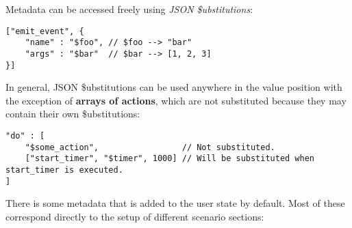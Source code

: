 \documentclass[a4paper]{article}
\begin{document}
\noindent
Metadata can be accessed freely using \emph{JSON \$ubstitutions}:


\begin{verbatim}
["emit_event", {
    "name" : "$foo", // $foo --> "bar"
    "args" : "$bar"  // $bar --> [1, 2, 3]
}]
\end{verbatim}




\noindent
In general, JSON \$ubstitutions can be used anywhere in the value position with the exception of \textbf{arrays of actions}, which are not substituted because they may contain their own \$ubstitutions:


\begin{verbatim}
"do" : [
    "$some_action",                 // Not substituted.
    ["start_timer", "$timer", 1000] // Will be substituted when start_timer is executed.
]
\end{verbatim}




\noindent
There is some metadata that is added to the user state by default. Most of these correspond directly to the setup of different scenario sections:
\end{document}

